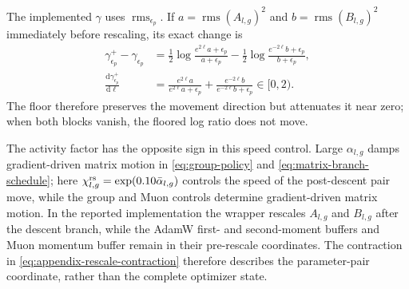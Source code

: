 \documentclass{article}
\newcommand{\rms}{\operatorname{rms}}
\begin{document}
The implemented $\gamma$ uses $\rms_{\epsilon_p}$.  If
$a=\rms(A_{l,g})^2$ and $b=\rms(B_{l,g})^2$ immediately before rescaling, its
exact change is
\begin{equation}
\begin{aligned}
    \gamma_{\epsilon_p}^{+}-\gamma_{\epsilon_p}
    &=
    \frac{1}{2}\log\frac{e^{2\ell}a+\epsilon_p}{a+\epsilon_p}
    -
    \frac{1}{2}\log\frac{e^{-2\ell}b+\epsilon_p}{b+\epsilon_p},
    \\
    \frac{\mathrm d\gamma_{\epsilon_p}^{+}}{\mathrm d\ell}
    &=
    \frac{e^{2\ell}a}{e^{2\ell}a+\epsilon_p}
    +
    \frac{e^{-2\ell}b}{e^{-2\ell}b+\epsilon_p}
    \in[0,2).
\end{aligned}
    \label{eq:appendix-floored-gamma-shift}
\end{equation}
The floor therefore preserves the movement direction but attenuates it near
zero; when both blocks vanish, the floored log ratio does not move.

The activity factor has the opposite sign in this speed control.  Large
$\alpha_{l,g}$ damps gradient-driven matrix motion in \eqref{eq:group-policy}
and \eqref{eq:matrix-branch-schedule}; here
$\chi^{\rm rs}_{l,g}=\exp(0.10\bar\alpha_{l,g})$ controls the speed of the
post-descent pair move, while the group and Muon controls determine
gradient-driven matrix motion.  In the reported implementation the wrapper
rescales $A_{l,g}$ and $B_{l,g}$ after the descent branch, while the AdamW
first- and second-moment buffers and Muon momentum buffer remain in their
pre-rescale coordinates.  The contraction in \eqref{eq:appendix-rescale-contraction}
therefore describes the parameter-pair coordinate, rather than the complete
optimizer state.
\end{document}
